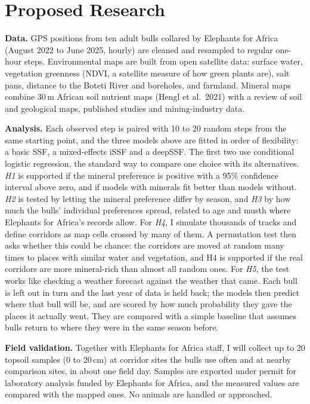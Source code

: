 \documentclass[11pt,a4paper]{article}
\begin{document}
\section{Proposed Research}
\textbf{Data.} GPS positions from ten adult bulls collared by Elephants for Africa (August 2022 to June 2025, hourly) are cleaned and resampled to regular one-hour steps. Environmental maps are built from open satellite data: surface water, vegetation greenness (NDVI, a satellite measure of how green plants are), salt pans, distance to the Boteti River and boreholes, and farmland. Mineral maps combine 30\,m African soil nutrient maps (Hengl et al.\ 2021) with a review of soil and geological maps, published studies and mining-industry data.

\textbf{Analysis.} Each observed step is paired with 10 to 20 random steps from the same starting point, and the three models above are fitted in order of flexibility: a basic SSF, a mixed-effects iSSF and a deepSSF. The first two use conditional logistic regression, the standard way to compare one choice with its alternatives. \textit{H1} is supported if the mineral preference is positive with a 95\% confidence interval above zero, and if models with minerals fit better than models without. \textit{H2} is tested by letting the mineral preference differ by season, and \textit{H3} by how much the bulls' individual preferences spread, related to age and musth where Elephants for Africa's records allow. For \textit{H4}, I simulate thousands of tracks and define corridors as map cells crossed by many of them. A permutation test then asks whether this could be chance: the corridors are moved at random many times to places with similar water and vegetation, and H4 is supported if the real corridors are more mineral-rich than almost all random ones. For \textit{H5}, the test works like checking a weather forecast against the weather that came. Each bull is left out in turn and the last year of data is held back; the models then predict where that bull will be, and are scored by how much probability they gave the places it actually went. They are compared with a simple baseline that assumes bulls return to where they were in the same season before.

\textbf{Field validation.} Together with Elephants for Africa staff, I will collect up to 20 topsoil samples (0 to 20\,cm) at corridor sites the bulls use often and at nearby comparison sites, in about one field day. Samples are exported under permit for laboratory analysis funded by Elephants for Africa, and the measured values are compared with the mapped ones. No animals are handled or approached.
\end{document}
